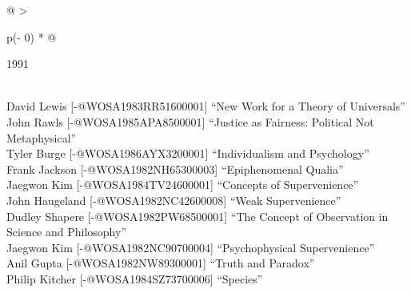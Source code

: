 \documentclass[
  10pt,
  letterpaper,
  DIV=11,
  numbers=noendperiod,
  twoside]{scrartcl}
\begin{document}
\begin{longtable}[]{@{}
  >{\raggedright\arraybackslash}p{(\columnwidth - 0\tabcolsep) * }@{}}

\caption{\label{tbl-top-ten-1982}Most cited articles published less than
ten years ago as of 1991.}

\tabularnewline

\toprule\noalign{}
\begin{minipage}[b]{\linewidth}\raggedright
1991
\end{minipage} \\
\midrule\noalign{}
\endhead
\bottomrule\noalign{}
\endlastfoot
David Lewis {[}-@WOSA1983RR51600001{]} ``New Work for a Theory of
Universals'' \\
John Rawls {[}-@WOSA1985APA8500001{]} ``Justice as Fairness: Political
Not Metaphysical'' \\
Tyler Burge {[}-@WOSA1986AYX3200001{]} ``Individualism and
Psychology'' \\
Frank Jackson {[}-@WOSA1982NH65300003{]} ``Epiphenomenal Qualia'' \\
Jaegwon Kim {[}-@WOSA1984TV24600001{]} ``Concepts of Supervenience'' \\
John Haugeland {[}-@WOSA1982NC42600008{]} ``Weak Supervenience'' \\
Dudley Shapere {[}-@WOSA1982PW68500001{]} ``The Concept of Observation
in Science and Philosophy'' \\
Jaegwon Kim {[}-@WOSA1982NC90700004{]} ``Psychophysical
Supervenience'' \\
Anil Gupta {[}-@WOSA1982NW89300001{]} ``Truth and Paradox'' \\
Philip Kitcher {[}-@WOSA1984SZ73700006{]} ``Species'' \\

\end{longtable}
\end{document}
